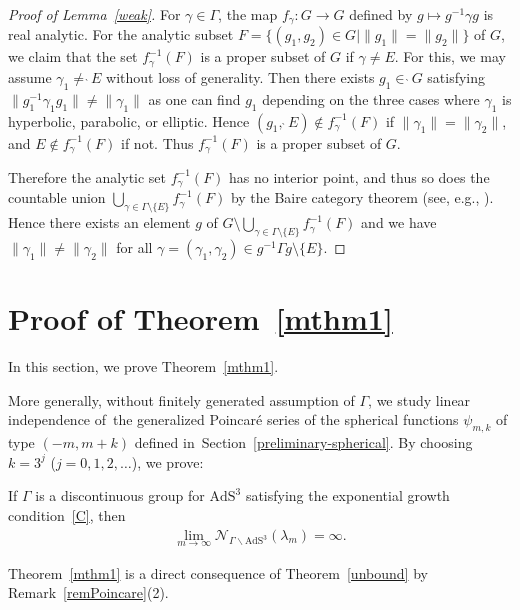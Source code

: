 \begin{proof}[Proof of Lemma~\ref{weak}]
For $\gamma \in \Gamma$,
the map $f_{\gamma}\colon G \rightarrow G$ defined by $g\mapsto g^{-1}\gamma g$
is real analytic.
For the analytic subset
$F = \{(g_1,g_2) \in G
\mid \|g_1\| = \|g_2\| \}$ of $G$, we claim that
the set $f_{\gamma}^{-1}(F)$ is a proper subset of $G$ if $\gamma\neq E$.
For this, we may assume $\gamma_1 \neq \grave{\ }E$ without loss of generality.
Then there exists
$g_1 \in \grave{\ }G$ satisfying $\|g_1^{-1}\gamma_1g_1\| \neq \|
\gamma_1\|$ as one can find $g_{1}$ depending on the three cases where
$\gamma_{1}$ is hyperbolic, parabolic, or elliptic.
Hence $(g_1,\grave{\ }E)\notin f_{\gamma}^{-1}(F)$ if $\|\gamma_{1}\|=\|\gamma_{2}\|$,
and $E\notin f_{\gamma}^{-1}(F)$ if not. Thus $f_{\gamma}^{-1}(F)$ is a proper subset of $G$.

Therefore the analytic set
$f_{\gamma}^{-1}(F)$ has no interior point, and thus so does the countable union
$\bigcup_{\gamma \in \Gamma \setminus \{E\}}
 f_{\gamma}^{-1}(F)$ by the Baire category theorem
(see, e.g., \cite[Theorem~2.2]{functional-analysis}).
Hence there exists an element
$g$ of $G\setminus\bigcup_{\gamma \in \Gamma \setminus \{E\}}
 f_{\gamma}^{-1}(F)$ and we have
$\|\gamma_1\|\neq\|\gamma_2\|$
for all $\gamma=(\gamma_1,\gamma_2)\in
g^{-1}\Gamma g \setminus \{E\}$.
\end{proof}

\section{Proof of Theorem~\ref{mthm1}}\label{proof-linear-indep}
In this section, we prove Theorem~\ref{mthm1}.

More generally, without finitely generated assumption of $\Gamma$,
we study linear independence of~the generalized Poincar\'e series
of the spherical functions $\psi_{m,k}$ of type $(-m,m+k)$
defined in~Section~\ref{preliminary-spherical}.
By choosing $k=3^{j}$ ($j=0,1,2,\ldots$),
we prove:
\begin{Theorem}
\label{unbound}
If $\Gamma$ is a discontinuous group for $\mathrm{AdS}^{3}$ satisfying
the exponential growth condition~\eqref{C}, then
\begin{gather*}
\lim_{m\to\infty}\mathcal{N}_{\Gamma\backslash\mathrm{AdS}^{3}}(\lambda_{m})=\infty.
\end{gather*}
\end{Theorem}
Theorem~\ref{mthm1} is a direct consequence of
Theorem~\ref{unbound} by Remark~\ref{remPoincare}(2).

